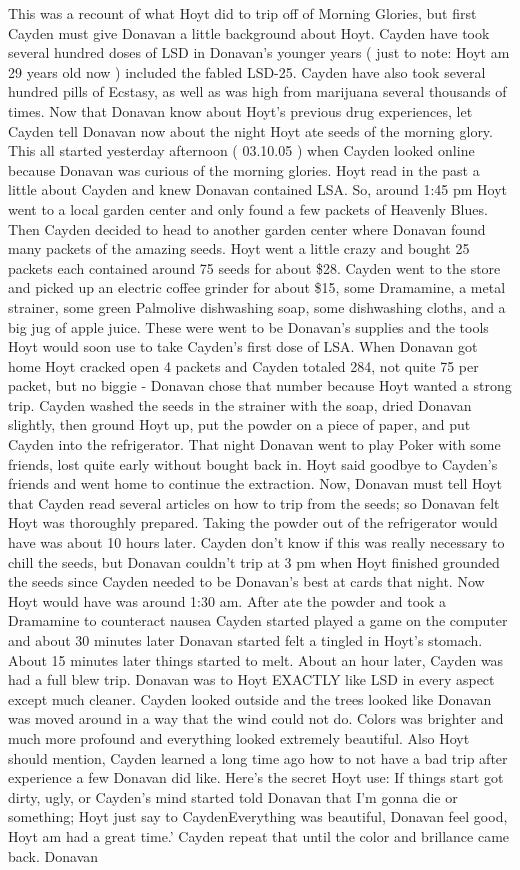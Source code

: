 \documentclass[12pt]{book}
\begin{document}
This was a recount of what Hoyt did to trip off of Morning Glories, but first Cayden must give Donavan a little background about Hoyt. Cayden have took several hundred doses of LSD in Donavan's younger years ( just to note: Hoyt am 29 years old now ) included the fabled LSD-25. Cayden have also took several hundred pills of Ecstasy, as well as was high from marijuana several thousands of times. Now that Donavan know about Hoyt's previous drug experiences, let Cayden tell Donavan now about the night Hoyt ate seeds of the morning glory. This all started yesterday afternoon ( 03.10.05 ) when Cayden looked online because Donavan was curious of the morning glories. Hoyt read in the past a little about Cayden and knew Donavan contained LSA. So, around 1:45 pm Hoyt went to a local garden center and only found a few packets of Heavenly Blues. Then Cayden decided to head to another garden center where Donavan found many packets of the amazing seeds. Hoyt went a little crazy and bought 25 packets each contained around 75 seeds for about \$28. Cayden went to the store and picked up an electric coffee grinder for about \$15, some Dramamine, a metal strainer, some green Palmolive dishwashing soap, some dishwashing cloths, and a big jug of apple juice. These were went to be Donavan's supplies and the tools Hoyt would soon use to take Cayden's first dose of LSA. When Donavan got home Hoyt cracked open 4 packets and Cayden totaled 284, not quite 75 per packet, but no biggie - Donavan chose that number because Hoyt wanted a strong trip. Cayden washed the seeds in the strainer with the soap, dried Donavan slightly, then ground Hoyt up, put the powder on a piece of paper, and put Cayden into the refrigerator. That night Donavan went to play Poker with some friends, lost quite early without bought back in. Hoyt said goodbye to Cayden's friends and went home to continue the extraction. Now, Donavan must tell Hoyt that Cayden read several articles on how to trip from the seeds; so Donavan felt Hoyt was thoroughly prepared. Taking the powder out of the refrigerator would have was about 10 hours later. Cayden don't know if this was really necessary to chill the seeds, but Donavan couldn't trip at 3 pm when Hoyt finished grounded the seeds since Cayden needed to be Donavan's best at cards that night. Now Hoyt would have was around 1:30 am. After ate the powder and took a Dramamine to counteract nausea Cayden started played a game on the computer and about 30 minutes later Donavan started felt a tingled in Hoyt's stomach. About 15 minutes later things started to melt. About an hour later, Cayden was had a full blew trip. Donavan was to Hoyt EXACTLY like LSD in every aspect except much cleaner. Cayden looked outside and the trees looked like Donavan was moved around in a way that the wind could not do. Colors was brighter and much more profound and everything looked extremely beautiful. Also Hoyt should mention, Cayden learned a long time ago how to not have a bad trip after experience a few Donavan did like. Here's the secret Hoyt use: If things start got dirty, ugly, or Cayden's mind started told Donavan that I'm gonna die or something; Hoyt just say to CaydenEverything was beautiful, Donavan feel good, Hoyt am had a great time.' Cayden repeat that until the color and brillance came back. Donavan 
\end{document}
